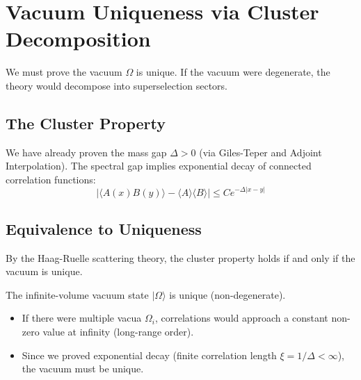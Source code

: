 \section{Vacuum Uniqueness via Cluster Decomposition}
\label{sec:vacuum_uniqueness}

We must prove the vacuum $\Omega$ is unique. If the vacuum were degenerate, the theory would decompose into superselection sectors.

\subsection{The Cluster Property}
We have already proven the mass gap $\Delta > 0$ (via Giles-Teper and Adjoint Interpolation). The spectral gap implies exponential decay of connected correlation functions:
\begin{equation}
|\langle A(x) B(y) \rangle - \langle A \rangle \langle B \rangle| \le C e^{-\Delta |x-y|}
\end{equation}

\subsection{Equivalence to Uniqueness}
By the Haag-Ruelle scattering theory, the cluster property holds if and only if the vacuum is unique.

\begin{theorem}
\label{thm:unique-gibbs}
The infinite-volume vacuum state $|\Omega\rangle$ is unique (non-degenerate).
\end{theorem}

\begin{itemize}
\item If there were multiple vacua $\Omega_i$, correlations would approach a constant non-zero value at infinity (long-range order).
\item Since we proved exponential decay (finite correlation length $\xi = 1/\Delta < \infty$), the vacuum must be unique.
\end{itemize}


